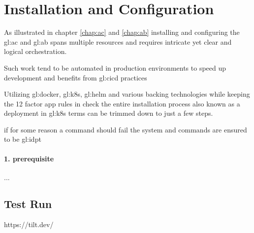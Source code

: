 %
\chapter{Installation and Configuration}

As illustrated in chapter \ref{chap:ac} and \ref{chap:ab} installing and configuring the \gls{gl:ac} and \gls{gl:ab} spans multiple resources and requires intricate yet clear and logical orchestration.

Such work tend to be automated in production environments to speed up development and benefits from \gls{gl:cicd} practices

Utilizing \gls{gl:docker}, \gls{gl:k8s}, \gls{gl:helm} and various backing technologies while keeping the 12 factor app \cite{TheTwelv47} rules in check the entire installation process also known as a deployment in \gls{gl:k8s} terms can be trimmed down to just a few steps.

if for some reason a command should fail the system and commands are ensured to be \gls{gl:idpt}

\subsubsection{1. prerequisite}

...

\section{Test Run}

https://tilt.dev/